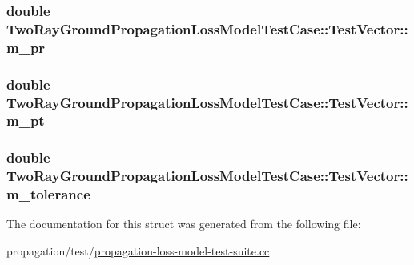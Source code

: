 \subsubsection[{\texorpdfstring{m\+\_\+pr}{m_pr}}]{\setlength{\rightskip}{0pt plus 5cm}double Two\+Ray\+Ground\+Propagation\+Loss\+Model\+Test\+Case\+::\+Test\+Vector\+::m\+\_\+pr}\hypertarget{structTwoRayGroundPropagationLossModelTestCase_1_1TestVector_a8f7fe080696e10432ff444556c7b9468}{}\label{structTwoRayGroundPropagationLossModelTestCase_1_1TestVector_a8f7fe080696e10432ff444556c7b9468}
\subsubsection[{\texorpdfstring{m\+\_\+pt}{m_pt}}]{\setlength{\rightskip}{0pt plus 5cm}double Two\+Ray\+Ground\+Propagation\+Loss\+Model\+Test\+Case\+::\+Test\+Vector\+::m\+\_\+pt}\hypertarget{structTwoRayGroundPropagationLossModelTestCase_1_1TestVector_a0457de22049c6a36e059d8d22f18d14a}{}\label{structTwoRayGroundPropagationLossModelTestCase_1_1TestVector_a0457de22049c6a36e059d8d22f18d14a}
\subsubsection[{\texorpdfstring{m\+\_\+tolerance}{m_tolerance}}]{\setlength{\rightskip}{0pt plus 5cm}double Two\+Ray\+Ground\+Propagation\+Loss\+Model\+Test\+Case\+::\+Test\+Vector\+::m\+\_\+tolerance}\hypertarget{structTwoRayGroundPropagationLossModelTestCase_1_1TestVector_a50affc056d660edf564c022b9cf4336c}{}\label{structTwoRayGroundPropagationLossModelTestCase_1_1TestVector_a50affc056d660edf564c022b9cf4336c}


The documentation for this struct was generated from the following file\+:\begin{DoxyCompactItemize}
\item 
propagation/test/\hyperlink{propagation-loss-model-test-suite_8cc}{propagation-\/loss-\/model-\/test-\/suite.\+cc}\end{DoxyCompactItemize}
